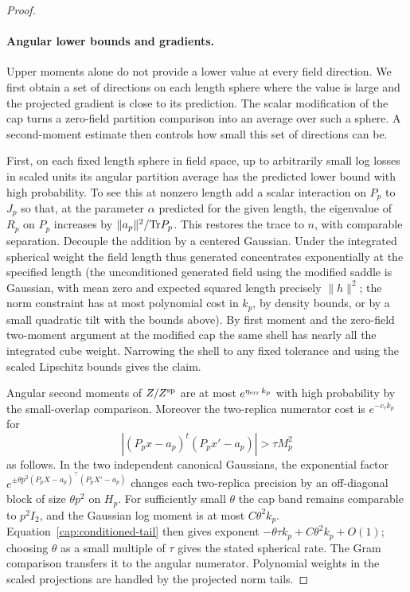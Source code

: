 \begin{proof}
\paragraph{Angular lower bounds and gradients.}
Upper moments alone do not provide a lower value at every field direction.
We first obtain a set of directions on each length sphere where the value
is large and the projected gradient is close to its prediction. The scalar
modification of the cap turns a zero-field partition comparison into an
average over such a sphere. A second-moment estimate then controls how
small this set of directions can be.

First, on each fixed length sphere in field space, up to arbitrarily small log
losses in scaled units its angular partition average has the predicted lower
bound with high probability. To see this at nonzero length add a scalar
interaction on \(P_p\) to \(J_p\) so that, at the parameter \(\alpha\)
predicted for the given length, the eigenvalue of \(R_p\) on \(P_p\) increases
by \(\|a_p\|^2/{\rm Tr}P_p\). This restores the trace to \(n\), with
comparable separation. Decouple the addition by a centered Gaussian. Under the
integrated spherical weight the field length thus generated concentrates
exponentially at the specified length (the unconditioned generated field using
the modified saddle is Gaussian, with mean zero and expected squared length
precisely \(\|h\|^2\); the norm constraint has at most polynomial cost in
\(k_p\), by density bounds, or by a small quadratic tilt with the bounds
above). By first moment and the zero-field two-moment argument at the modified
cap the same shell has nearly all the integrated cube weight. Narrowing the
shell to any fixed tolerance and using the scaled Lipschitz bounds gives the
claim.

Angular second moments of \(Z/Z^{\rm sp}\) are at most \(e^{\eta_{\rm
err}\,k_p}\) with high probability by the small-overlap comparison. Moreover
the two-replica numerator cost is \(e^{-c_\tau k_p}\) for
\begin{equation}
 |(P_p x-a_p)^t(P_p x'-a_p)|>\tau M_p^2
\end{equation}
as follows. In the two independent canonical Gaussians, the exponential
factor \(e^{\pm\theta p^2(P_pX-a_p)^\top(P_pX'-a_p)}\) changes each
two-replica precision by an off-diagonal block of size \(\theta p^2\) on
\(H_p\). For sufficiently small \(\theta\) the cap band remains comparable
to \(p^2I_2\), and the Gaussian log moment is at most \(C\theta^2 k_p\).
Equation~\eqref{cap:conditioned-tail} then gives exponent
\(-\theta\tau k_p+C\theta^2k_p+O(1)\); choosing \(\theta\) as a small
multiple of \(\tau\) gives the stated spherical rate. The Gram comparison
transfers it to the angular numerator. Polynomial weights in the scaled
projections are handled by the projected norm tails.


\end{proof}
